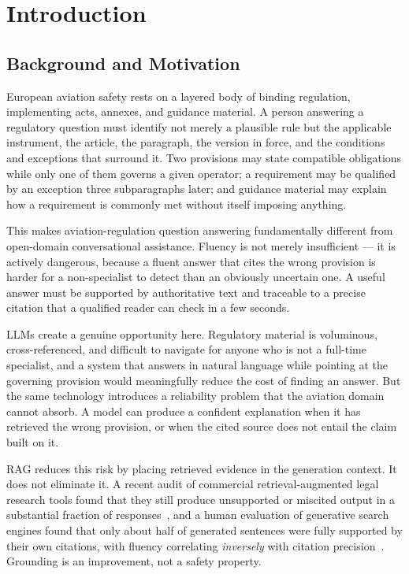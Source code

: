 \chapter{Introduction}
\label{chap:introduction}

\section{Background and Motivation}
\label{sec:intro-background}

European aviation safety rests on a layered body of binding regulation, implementing acts, annexes, and guidance material. A person answering a regulatory question must identify not merely a plausible rule but the applicable instrument, the article, the paragraph, the version in force, and the conditions and exceptions that surround it. Two provisions may state compatible obligations while only one of them governs a given operator; a requirement may be qualified by an exception three subparagraphs later; and guidance material may explain how a requirement is commonly met without itself imposing anything.

This makes aviation-regulation question answering fundamentally different from open-domain conversational assistance. Fluency is not merely insufficient --- it is actively dangerous, because a fluent answer that cites the wrong provision is harder for a non-specialist to detect than an obviously uncertain one. A useful answer must be supported by authoritative text and traceable to a precise citation that a qualified reader can check in a few seconds.

\acp{LLM} create a genuine opportunity here. Regulatory material is voluminous, cross-referenced, and difficult to navigate for anyone who is not a full-time specialist, and a system that answers in natural language while pointing at the governing provision would meaningfully reduce the cost of finding an answer. But the same technology introduces a reliability problem that the aviation domain cannot absorb. A model can produce a confident explanation when it has retrieved the wrong provision, or when the cited source does not entail the claim built on it.

\ac{RAG} reduces this risk by placing retrieved evidence in the generation context. It does not eliminate it. A recent audit of commercial retrieval-augmented legal research tools found that they still produce unsupported or miscited output in a substantial fraction of responses~\cite{magesh2025hallucination}, and a human evaluation of generative search engines found that only about half of generated sentences were fully supported by their own citations, with fluency correlating \emph{inversely} with citation precision~\cite{liu2023verifiability}. Grounding is an improvement, not a safety property.


